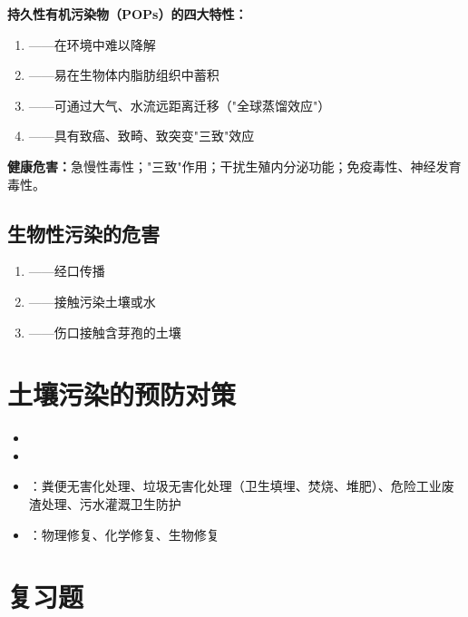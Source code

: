 \documentclass[10pt,a4paper,oneside]{ctexbook}
\begin{document}
\begin{keybox}
\textbf{持久性有机污染物（POPs）的四大特性：}
\begin{enumerate}[leftmargin=*]
    \item {}——在环境中难以降解
    \item {}——易在生物体内脂肪组织中蓄积
    \item {}——可通过大气、水流远距离迁移（"全球蒸馏效应"）
    \item {}——具有致癌、致畸、致突变"三致"效应
\end{enumerate}

\textbf{健康危害：}急慢性毒性；"三致"作用；干扰生殖内分泌功能；免疫毒性、神经发育毒性。
\end{keybox}

\subsection{生物性污染的危害}

\begin{enumerate}[leftmargin=*]
    \item {}——经口传播
    \item {}——接触污染土壤或水
    \item {}——伤口接触含芽孢的土壤
\end{enumerate}

\section{土壤污染的预防对策}

\begin{itemize}[leftmargin=*]
    \item {}
    \item {}
    \item {}：粪便无害化处理、垃圾无害化处理（卫生填埋、焚烧、堆肥）、危险工业废渣处理、污水灌溉卫生防护
    \item {}：物理修复、化学修复、生物修复
\end{itemize}

\section{复习题}
\end{document}
